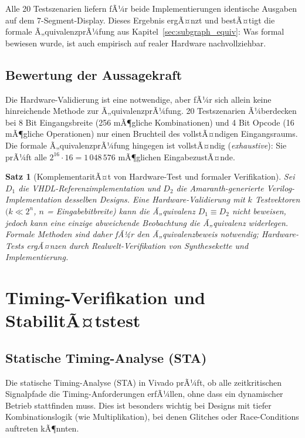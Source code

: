 ﻿\documentclass[12pt,a4paper]{report}
\newtheorem{theorem}{Satz}[section]
\begin{document}
Alle 20 Testszenarien liefern fÃ¼r beide Implementierungen identische Ausgaben auf dem 7-Segment-Display. Dieses Ergebnis ergÃ¤nzt und bestÃ¤tigt die formale Ã„quivalenzprÃ¼fung aus Kapitel~\ref{sec:subgraph_equiv}: Was formal bewiesen wurde, ist auch empirisch auf realer Hardware nachvollziehbar.

\subsection{Bewertung der Aussagekraft}
\label{subsec:aussagekraft}

Die Hardware-Validierung ist eine notwendige, aber fÃ¼r sich allein keine hinreichende Methode zur Ã„quivalenzprÃ¼fung. 20 Testszenarien Ã¼berdecken bei 8 Bit Eingangsbreite (256 mÃ¶gliche Kombinationen) und 4 Bit Opcode (16 mÃ¶gliche Operationen) nur einen Bruchteil des vollstÃ¤ndigen Eingangsraums. Die formale Ã„quivalenzprÃ¼fung hingegen ist vollstÃ¤ndig (\textit{exhaustive}): Sie prÃ¼ft alle $2^{16} \cdot 16 = 1\,048\,576$ mÃ¶glichen EingabezustÃ¤nde.

\begin{theorem}[KomplementaritÃ¤t von Hardware-Test und formaler Verifikation]
Sei $D_1$ die VHDL-Referenzimplementation und $D_2$ die Amaranth-generierte Verilog-Implementation desselben Designs. Eine Hardware-Validierung mit $k$ Testvektoren $(k \ll 2^n$, $n$ = Eingabebitbreite) kann die Ã„quivalenz $D_1 \equiv D_2$ nicht beweisen, jedoch kann eine einzige abweichende Beobachtung die Ã„quivalenz widerlegen. Formale Methoden sind daher fÃ¼r den Ã„quivalenzbeweis notwendig; Hardware-Tests ergÃ¤nzen durch Realwelt-Verifikation von Synthesekette und Implementierung.
\end{theorem}

\section{Timing-Verifikation und StabilitÃ¤tstest}
\label{sec:timing_stabilitaet}

\subsection{Statische Timing-Analyse (STA)}
\label{subsec:sta}

Die statische Timing-Analyse (STA) in Vivado prÃ¼ft, ob alle zeitkritischen Signalpfade die Timing-Anforderungen erfÃ¼llen, ohne dass ein dynamischer Betrieb stattfinden muss. Dies ist besonders wichtig bei Designs mit tiefer Kombinationslogik (wie Multiplikation), bei denen Glitches oder Race-Conditions auftreten kÃ¶nnten.
\end{document}
